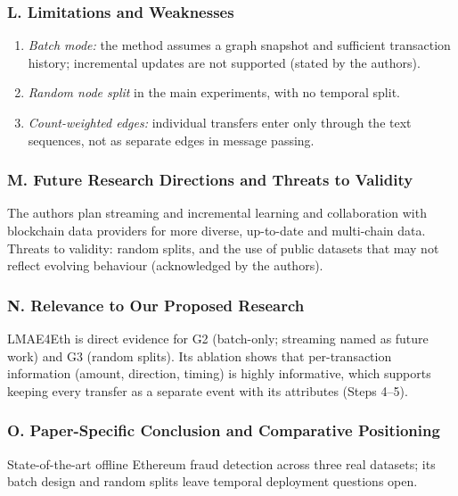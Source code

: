 \documentclass[11pt,a4paper]{article}
\begin{document}
\subsubsection*{L. Limitations and Weaknesses}
\begin{enumerate}[leftmargin=*]
    \item \textit{Batch mode:} the method assumes a graph snapshot and sufficient transaction history; incremental updates are not supported (stated by the authors).
    \item \textit{Random node split} in the main experiments, with no temporal split.
    \item \textit{Count-weighted edges:} individual transfers enter only through the text sequences, not as separate edges in message passing.
\end{enumerate}

\subsubsection*{M. Future Research Directions and Threats to Validity}
The authors plan streaming and incremental learning and collaboration with blockchain data providers for more diverse, up-to-date and multi-chain data. Threats to validity: random splits, and the use of public datasets that may not reflect evolving behaviour (acknowledged by the authors).

\subsubsection*{N. Relevance to Our Proposed Research}
LMAE4Eth is direct evidence for G2 (batch-only; streaming named as future work) and G3 (random splits). Its ablation shows that per-transaction information (amount, direction, timing) is highly informative, which supports keeping every transfer as a separate event with its attributes (Steps 4--5).

\subsubsection*{O. Paper-Specific Conclusion and Comparative Positioning}
State-of-the-art offline Ethereum fraud detection across three real datasets; its batch design and random splits leave temporal deployment questions open.

\end{document}
